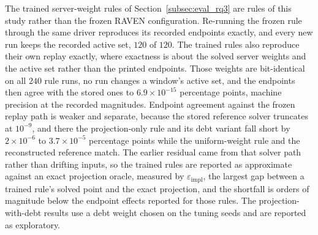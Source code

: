 \documentclass[letterpaper,journal]{IEEEtran}
\begin{document}
The trained server-weight rules of Section~\ref{subsec:eval_rq3} are rules of
this study rather than the frozen RAVEN configuration.  Re-running the frozen
rule through the same driver reproduces its recorded endpoints exactly, and every
new run keeps the recorded active set, $120$ of $120$.  The trained rules also
reproduce their own replay exactly, where exactness is about the solved server
weights and the active set rather than the printed endpoints.  Those weights are
bit-identical on all $240$ rule runs, no run changes a window's active set, and
the endpoints then agree with the stored ones to $6.9\times10^{-15}$ percentage
points, machine precision at the recorded magnitudes.  Endpoint agreement against
the frozen replay path is weaker and separate, because the stored reference
solver truncates at $10^{-9}$, and there the projection-only rule and its debt
variant fall short by $2\times10^{-6}$ to $3.7\times10^{-5}$ percentage points
while the uniform-weight rule and the reconstructed reference match.  The earlier
residual came from that solver path rather than drifting inputs, so the trained
rules are reported as approximate against an exact projection oracle, measured
by $\varepsilon_{\mathrm{impl}}$, the largest gap between a trained rule's solved
point and the exact projection, and the shortfall is orders of magnitude below
the endpoint effects reported for those rules.  The projection-with-debt results
use a debt weight chosen on the tuning seeds and are reported as exploratory.



\end{document}
